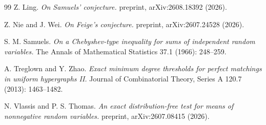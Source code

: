 \documentclass[10pt,a4paper]{article}
\begin{document}
\begin{thebibliography}{99}
Z. Ling.
\emph{On Samuels' conjecture.}
preprint, arXiv:2608.18392 (2026).

Z. Nie and J. Wei.
\emph{On Feige's conjecture.}
preprint, arXiv:2607.24528 (2026).

S. M. Samuels.
\emph{On a Chebyshev-type inequality for sums of independent random variables.}
The Annals of Mathematical Statistics 37.1 (1966): 248--259.

A. Treglown and Y. Zhao.
\emph{Exact minimum degree thresholds for perfect matchings in uniform hypergraphs II.}
Journal of Combinatorial Theory, Series A 120.7 (2013): 1463--1482.

N. Vlassis and P. S. Thomas.
\emph{An exact distribution-free test for means of nonnegative random variables.}
preprint, arXiv:2607.08415 (2026).

\end{thebibliography}
\end{document}
